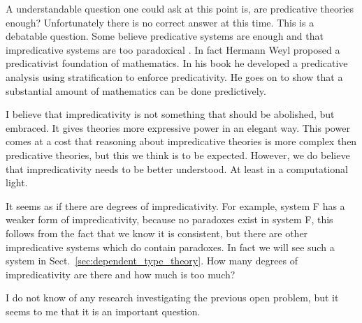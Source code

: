 A understandable question one could ask at this point is, are
predicative theories enough? Unfortunately there is no correct answer
at this time.  This is a debatable question.  Some believe
predicative systems are enough and that impredicative systems are too
paradoxical \cite{Feferman:2005}.  In fact Hermann Weyl proposed a
predicativist foundation of mathematics.  In his book \cite{Weyl:1918}
he developed a predicative analysis using stratification to enforce
predicativity.  He goes on to show that a substantial amount of
mathematics can be done predictively.

I believe that impredicativity is not something that should be
abolished, but embraced.  It gives theories more expressive power in
an elegant way. This power comes at a cost that reasoning about
impredicative theories is more complex then predicative theories, but
this we think is to be expected.  However, we do believe that
impredicativity needs to be better understood.  At least in a
computational light.  

\begin{openproblem}
  It seems as if there are degrees of impredicativity.  For example,
  system F has a weaker form of impredicativity, because no paradoxes
  exist in system F, this follows from the fact that we know it is
  consistent, but there are other impredicative systems which do
  contain paradoxes.  In fact we will see such a system in
  Sect.~\ref{sec:dependent_type_theory}.  How many degrees of
  impredicativity are there and how much is too much?
\end{openproblem}

\noindent
I do not know of any research investigating the previous open problem,
but it seems to me that it is an important question.
